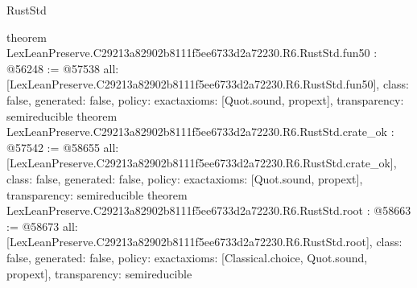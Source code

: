 \begin{lexlean}{RustStd}
\begin{coremodule}
{}
theorem LexLeanPreserve.C29213a82902b8111f5ee6733d2a72230.R6.RustStd.fun50 : @56248 := @57538 {
  all: [LexLeanPreserve.C29213a82902b8111f5ee6733d2a72230.R6.RustStd.fun50],
  class: false,
  generated: false,
  policy: exact{axioms: [Quot.sound, propext]},
  transparency: semireducible
}
theorem LexLeanPreserve.C29213a82902b8111f5ee6733d2a72230.R6.RustStd.crate_ok : @57542 := @58655 {
  all: [LexLeanPreserve.C29213a82902b8111f5ee6733d2a72230.R6.RustStd.crate_ok],
  class: false,
  generated: false,
  policy: exact{axioms: [Quot.sound, propext]},
  transparency: semireducible
}
theorem LexLeanPreserve.C29213a82902b8111f5ee6733d2a72230.R6.RustStd.root : @58663 := @58673 {
  all: [LexLeanPreserve.C29213a82902b8111f5ee6733d2a72230.R6.RustStd.root],
  class: false,
  generated: false,
  policy: exact{axioms: [Classical.choice, Quot.sound, propext]},
  transparency: semireducible
}


\end{coremodule}
\end{lexlean}
